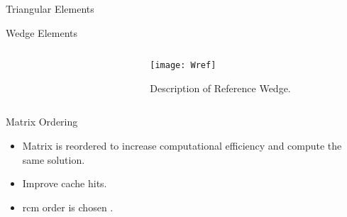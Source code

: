 \begin{frame}{Triangular Elements}
  \begin{figure}
    \centering
    \vspace{0.2in}
    \label{fig:triangle_elements}
  \end{figure}
\end{frame}

\begin{frame}{Wedge Elements}
  \begin{columns}
    \begin{column}{0.5\textwidth}
      \begin{figure}
        \centering
        \hspace{0.1\textwidth}
        \label{fig:sketch_wedge}
      \end{figure}
    \end{column}
    \begin{column}{0.5\textwidth}
      \vspace*{\fill}
      \begin{figure}
        \centering
        \texttt{[image: Wref]}
        \caption{Description of Reference Wedge.}
        \label{fig:Wref}
      \end{figure}
      \vspace*{\fill}
    \end{column}
  \end{columns}
\end{frame}

\begin{frame}{Matrix Ordering}
  \begin{itemize}
    \item Matrix is reordered to increase computational efficiency and compute
      the same solution.
    \item Improve cache hits.
    \item \gls{rcm} order is chosen \cite{rcm}.
  \end{itemize}
  \vspace{-0.25in}
  \begin{figure}
    \centering
    \hspace{0.1in}
    \label{fig:sparsity_pattern}
  \end{figure}
\end{frame}

